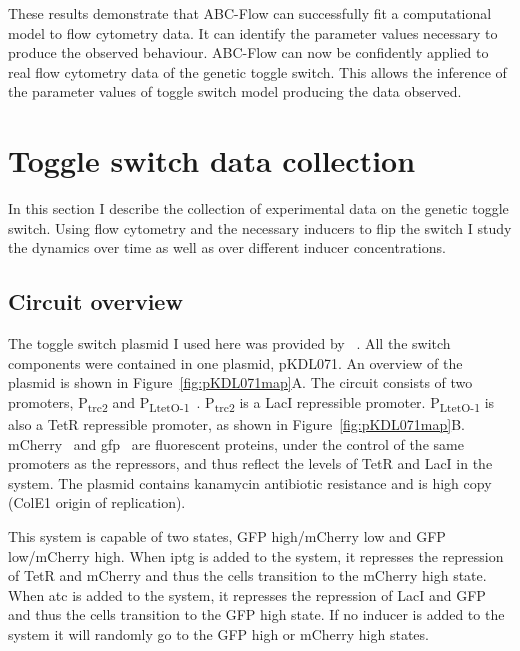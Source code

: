 \clearpage
These results demonstrate that ABC-Flow can successfully fit a computational model to flow cytometry data. It can identify the parameter values necessary to produce the observed behaviour. ABC-Flow can now be confidently applied to real flow cytometry data of the genetic toggle switch. This allows the inference of the parameter values of toggle switch model producing the data observed. %


\section{Toggle switch data collection}

In this section I describe the collection of experimental data on the genetic toggle switch. Using flow cytometry and the necessary inducers to flip the switch I study the dynamics over time as well as over different inducer concentrations. 

\subsection{Circuit overview}

The toggle switch plasmid I used here was provided by ~\textcite{Litcofsky:2012gr}. All the switch components were contained in one plasmid, pKDL071. An overview of the plasmid is shown in Figure~\ref{fig:pKDL071map}A. The circuit consists of two promoters, P\textsubscript{trc2} and P\textsubscript{LtetO-1}~\autocite{Lutz:1997ti}. P\textsubscript{trc2} is a LacI repressible promoter. P\textsubscript{LtetO-1} is also a TetR repressible promoter, as shown in Figure~\ref{fig:pKDL071map}B. mCherry~\autocite{Shaner:2004vy} and \acrshort{gfp}~\autocite{SHIMOMURA:1962va} are fluorescent proteins, under the control of the same promoters as the repressors, and thus reflect the levels of TetR and LacI in the system. The plasmid contains kanamycin antibiotic resistance and is high copy (ColE1 origin of replication).

This system is capable of two states, GFP high/mCherry low and GFP low/mCherry high. When \acrshort{iptg} is added to the system, it represses the repression of TetR and mCherry and thus the cells transition to the mCherry high state. When \acrshort{atc} is added to the system, it represses the repression of LacI and GFP and thus the cells transition to the GFP high state. If no inducer is added to the system it will randomly go to the GFP high or mCherry high states.

